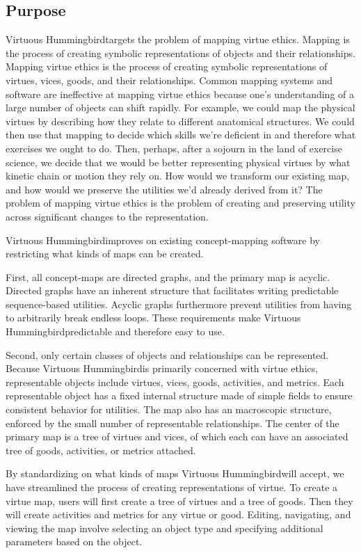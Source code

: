 \documentclass{article}
\newcommand{\name}{Virtuous Hummingbird}
\begin{document}
\subsection{Purpose}

\name targets the problem of mapping virtue ethics.
Mapping is the process of creating symbolic representations of objects and their relationships.
Mapping virtue ethics is the process of creating symbolic representations of virtues, vices, goods, and their relationships.
Common mapping systems and software are ineffective at mapping virtue ethics because one's understanding of a large number of objects can shift rapidly.
For example, we could map the physical virtues by describing how they relate to different anatomical structures.
We could then use that mapping to decide which skills we're deficient in and therefore what exercises we ought to do.
Then, perhaps, after a sojourn in the land of exercise science, we decide that we would be better representing physical virtues by what kinetic chain or motion they rely on.
How would we transform our existing map, and how would we preserve the utilities we'd already derived from it?
The problem of mapping virtue ethics is the problem of creating and preserving utility across significant changes to the representation.

\name improves on existing concept-mapping software by restricting what kinds of maps can be created.

First, all concept-maps are directed graphs, and the primary map is acyclic.
Directed graphs have an inherent structure that facilitates writing predictable sequence-based utilities.
Acyclic graphs furthermore prevent utilities from having to arbitrarily break endless loops.
These requirements make \name predictable and therefore easy to use.

Second, only certain classes of objects and relationships can be represented.
Because \name is primarily concerned with virtue ethics, representable objects include virtues, vices, goods, activities, and metrics.
Each representable object has a fixed internal structure made of simple fields to ensure consistent behavior for utilities.
The map also has an macroscopic structure, enforced by the small number of representable relationships.
The center of the primary map is a tree of virtues and vices, of which each can have an associated tree of goods, activities, or metrics attached.

By standardizing on what kinds of maps \name will accept, we have streamlined the process of creating representations of virtue.
To create a virtue map, users will first create a tree of virtues and a tree of goods.
Then they will create activities and metrics for any virtue or good.
Editing, navigating, and viewing the map involve selecting an object type and specifying additional parameters based on the object.
\end{document}
